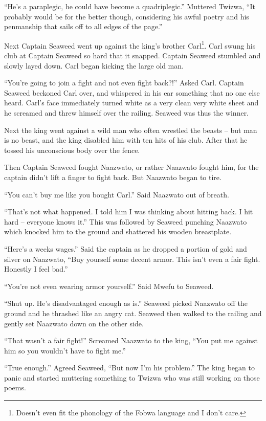 ``He's a paraplegic, he could have become a quadriplegic.'' Muttered Twizwa, ``It probably would be for the better though, considering his awful poetry and his penmanship that sails off to all edges of the page.''

Next Captain Seaweed went up against the king's brother Carl\footnote{Doesn't even fit the phonology of the Fobwa language and I don't care.}.
Carl swung his club at Captain Seaweed so hard that it snapped. Captain Seaweed stumbled and slowly layed down. Carl began kicking the large old man.

``You're going to join a fight and not even fight back?!'' Asked Carl. Captain Seaweed beckoned Carl over, and whispered in his ear something that no one else heard. Carl's face immediately turned white as a very clean very white sheet and he screamed and threw himself over the railing. Seaweed was thus the winner.

Next the king went against a wild man who often wrestled the beasts -- but man is no beast, and the king disabled him with ten hits of his club. After that he tossed his unconscious body over the fence.

Then Captain Seaweed fought Naazwato, or rather Naazwato fought him, for the captain didn't lift a finger to fight back. But Naazwato began to tire.

``You can't buy me like you bought Carl.'' Said Naazwato out of breath.

``That's not what happened. I told him I was thinking about hitting back. I hit hard -- everyone knows it.'' This was followed by Seaweed punching Naazwato which knocked him to the ground and shattered his wooden breastplate.

``Here's a weeks wages.'' Said the captain as he dropped a portion of gold and silver on Naazwato, ``Buy yourself some decent armor. This isn't even a fair fight. Honestly I feel bad.''

``You're not even wearing armor yourself.'' Said Mwefu to Seaweed.

``Shut up. He's disadvantaged enough as is.'' Seaweed picked Naazwato off the ground and he thrashed like an angry cat. Seaweed then walked to the railing and gently set Naazwato down on the other side.

``That wasn't a fair fight!'' Screamed Naazwato to the king, ``You put me against him so you wouldn't have to fight me.''

``True enough.'' Agreed Seaweed, ``But now I'm his problem.'' The king began to panic and started muttering something to Twizwa who was still working on those poems.

